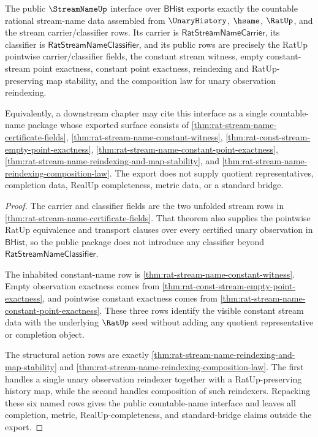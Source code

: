 \begin{theorem}
\label{thm:streamname-public-countable-name-interface}
The public $\StreamNameUp$ interface over $\mathsf{BHist}$ exports exactly the
countable rational stream-name data assembled from $\UnaryHistory$, $\hsame$,
$\RatUp$, and the stream carrier/classifier rows.  Its carrier is
$\mathsf{RatStreamNameCarrier}$, its classifier is
$\mathsf{RatStreamNameClassifier}$, and its public rows are precisely the
RatUp pointwise carrier/classifier fields, the constant stream witness, empty
constant-stream point exactness, constant point exactness, reindexing and
RatUp-preserving map stability, and the composition law for unary observation
reindexing.

Equivalently, a downstream chapter may cite this interface as a single
countable-name package whose exported surface consists of
\autoref{thm:rat-stream-name-certificate-fields},
\autoref{thm:rat-stream-name-constant-witness},
\autoref{thm:rat-const-stream-empty-point-exactness},
\autoref{thm:rat-stream-name-constant-point-exactness},
\autoref{thm:rat-stream-name-reindexing-and-map-stability}, and
\autoref{thm:rat-stream-name-reindexing-composition-law}.  The export does
not supply quotient representatives, completion data, RealUp completeness,
metric data, or a standard bridge.
\end{theorem}

\begin{proof}
The carrier and classifier fields are the two unfolded stream rows in
\autoref{thm:rat-stream-name-certificate-fields}.  That theorem also supplies
the pointwise RatUp equivalence and transport clauses over every certified
unary observation in $\mathsf{BHist}$, so the public package does not introduce
any classifier beyond $\mathsf{RatStreamNameClassifier}$.

The inhabited constant-name row is
\autoref{thm:rat-stream-name-constant-witness}.  Empty observation exactness
comes from \autoref{thm:rat-const-stream-empty-point-exactness}, and pointwise
constant exactness comes from
\autoref{thm:rat-stream-name-constant-point-exactness}.  These three rows
identify the visible constant stream data with the underlying $\RatUp$ seed
without adding any quotient representative or completion object.

The structural action rows are exactly
\autoref{thm:rat-stream-name-reindexing-and-map-stability} and
\autoref{thm:rat-stream-name-reindexing-composition-law}.  The first handles a
single unary observation reindexer together with a RatUp-preserving history
map, while the second handles composition of such reindexers.  Repacking these
six named rows gives the public countable-name interface and leaves all
completion, metric, RealUp-completeness, and standard-bridge claims outside
the export.
\end{proof}

